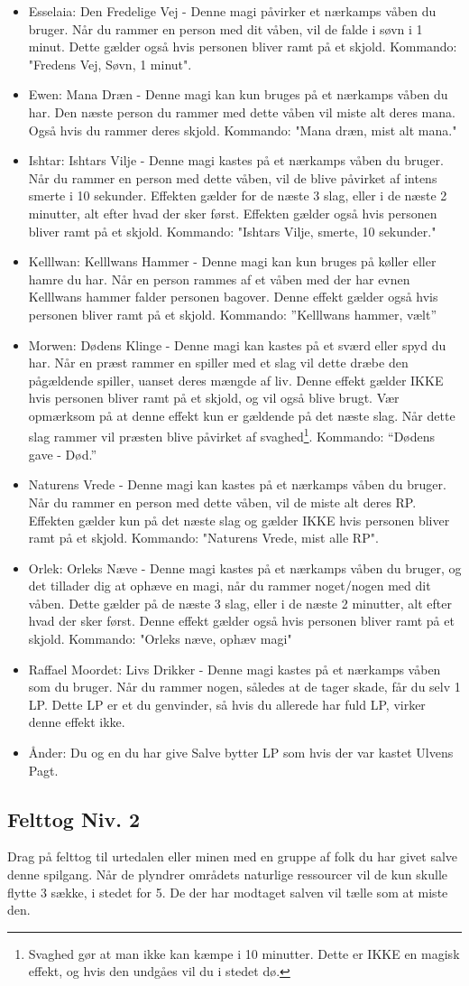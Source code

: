 \begin{itemize}
    \item Esselaia: Den Fredelige Vej - Denne magi påvirker et nærkamps våben du bruger. Når du rammer en person med dit våben, vil de falde i søvn i 1 minut. Dette gælder også hvis personen bliver ramt på et skjold. Kommando: "Fredens Vej, Søvn, 1 minut".
    \item Ewen: Mana Dræn - Denne magi kan kun bruges på et nærkamps våben du har. Den næste person du rammer med dette våben vil miste alt deres mana. Også hvis du rammer deres skjold. Kommando: "Mana dræn, mist alt mana."
    \item Ishtar: Ishtars Vilje - Denne magi kastes på et nærkamps våben du bruger. Når du rammer en person med dette våben, vil de blive påvirket af intens smerte i 10 sekunder. Effekten gælder for de næste 3 slag, eller i de næste 2 minutter, alt efter hvad der sker først. Effekten gælder også hvis personen bliver ramt på et skjold. Kommando: "Ishtars Vilje, smerte, 10 sekunder."
    \item Kelllwan: Kelllwans Hammer - Denne magi kan kun bruges på køller eller hamre du har. Når en person rammes af et våben med der har evnen Kelllwans hammer falder personen bagover. Denne effekt gælder også hvis personen bliver ramt på et skjold. Kommando: ”Kelllwans hammer, vælt”
    \item Morwen: Dødens Klinge - Denne magi kan kastes på et sværd eller spyd du har. Når en præst rammer en spiller med et slag vil dette dræbe den pågældende spiller, uanset deres mængde af liv. Denne effekt gælder IKKE hvis personen bliver ramt på et skjold, og vil også blive brugt. Vær opmærksom på at denne effekt kun er gældende på det næste slag. Når dette slag rammer vil præsten blive påvirket af svaghed\footnote{Svaghed gør at man ikke kan kæmpe i 10 minutter. Dette er IKKE en magisk effekt, og hvis den undgåes vil du i stedet dø.}. Kommando: “Dødens gave - Død.”
    \item Naturens Vrede - Denne magi kan kastes på et nærkamps våben du bruger. Når du rammer en person med dette våben, vil de miste alt deres RP. Effekten gælder kun på det næste slag og gælder IKKE hvis personen bliver ramt på et skjold. Kommando: "Naturens Vrede, mist alle RP".
    \item Orlek: Orleks Næve - Denne magi kastes på et nærkamps våben du bruger, og det tillader dig at ophæve en magi, når du rammer noget/nogen med dit våben. Dette gælder på de næste 3 slag, eller i de næste 2 minutter, alt efter hvad der sker først. Denne effekt gælder også hvis personen bliver ramt på et skjold. Kommando: "Orleks næve, ophæv magi"
    \item Raffael Moordet: Livs Drikker -  Denne magi kastes på et nærkamps våben som du bruger. Når du rammer nogen, således at de tager skade, får du selv 1 LP. Dette LP er et du genvinder, så hvis du allerede har fuld LP, virker denne effekt ikke.
    \item Ånder: Du og en du har give Salve bytter LP som hvis der var kastet Ulvens Pagt. 
\end{itemize}

\subsection{Felttog Niv. 2}
Drag på felttog til urtedalen eller minen med en gruppe af folk du har givet salve denne spilgang. Når de plyndrer områdets naturlige ressourcer vil de kun skulle flytte 3 sække, i stedet for 5. De der har modtaget salven vil tælle som at miste den.